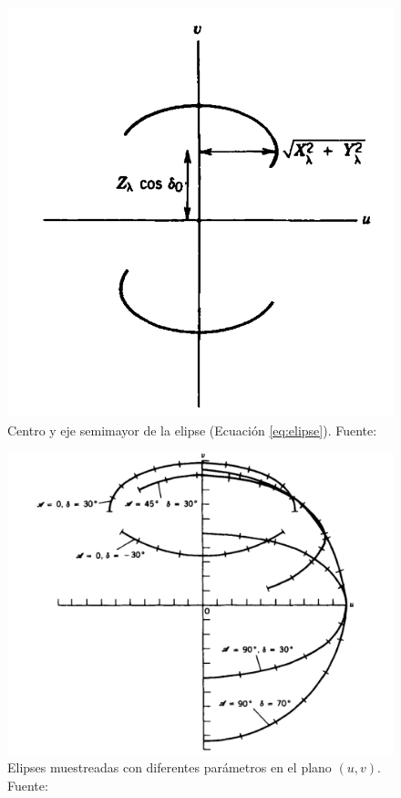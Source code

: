 \begin{figure}[h!]
	\centering
	\includegraphics[scale=0.3]{images/uvplane1.png}
	\caption{Centro y eje semimayor de la elipse (Ecuación \ref{eq:elipse}). Fuente: \citep{libroAstro}}
	\label{fig:uvplane1}
\end{figure}

\begin{figure}[h!]
	\centering
	\includegraphics[scale=0.3]{images/uvplane2.png}
	\caption{Elipses muestreadas con diferentes parámetros en el plano $(u,v)$. Fuente: \citep{libroAstro}}
	\label{fig:uvplane2}
\end{figure}



